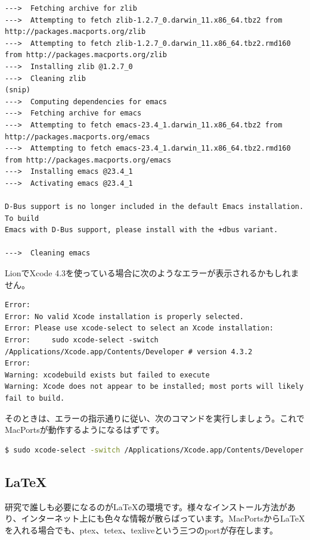 \begin{lstlisting}
--->  Fetching archive for zlib
--->  Attempting to fetch zlib-1.2.7_0.darwin_11.x86_64.tbz2 from http://packages.macports.org/zlib
--->  Attempting to fetch zlib-1.2.7_0.darwin_11.x86_64.tbz2.rmd160 from http://packages.macports.org/zlib
--->  Installing zlib @1.2.7_0
--->  Cleaning zlib
(snip)
--->  Computing dependencies for emacs
--->  Fetching archive for emacs
--->  Attempting to fetch emacs-23.4_1.darwin_11.x86_64.tbz2 from http://packages.macports.org/emacs
--->  Attempting to fetch emacs-23.4_1.darwin_11.x86_64.tbz2.rmd160 from http://packages.macports.org/emacs
--->  Installing emacs @23.4_1
--->  Activating emacs @23.4_1

D-Bus support is no longer included in the default Emacs installation. To build
Emacs with D-Bus support, please install with the +dbus variant.

--->  Cleaning emacs
\end{lstlisting}

LionでXcode 4.3を使っている場合に次のようなエラーが表示されるかもしれません。

\begin{lstlisting}
Error: 
Error: No valid Xcode installation is properly selected.
Error: Please use xcode-select to select an Xcode installation:
Error:     sudo xcode-select -switch /Applications/Xcode.app/Contents/Developer # version 4.3.2
Error: 
Warning: xcodebuild exists but failed to execute
Warning: Xcode does not appear to be installed; most ports will likely fail to build.
\end{lstlisting}

そのときは、エラーの指示通りに従い、次のコマンドを実行しましょう。これでMacPortsが動作するようになるはずです。
\begin{lstlisting}[language=bash]
$ sudo xcode-select -switch /Applications/Xcode.app/Contents/Developer
\end{lstlisting}

\subsection{\LaTeX}

研究で誰しも必要になるのが\LaTeX{}の環境です。様々なインストール方法があり、インターネット上にも色々な情報が散らばっています。MacPortsから\LaTeX{}を入れる場合でも、ptex、tetex、texliveという三つのportが存在します。

